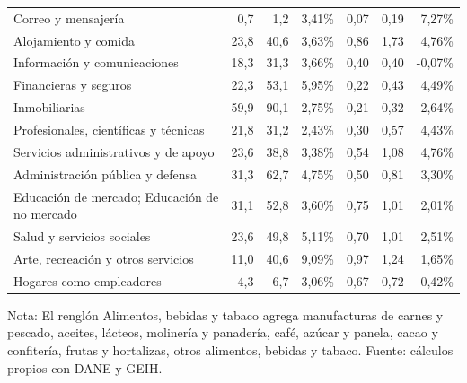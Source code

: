 \begin{longtable}{p{}rrrrrr}
Correo y mensajería & 0,7 & 1,2 & 3,41\% & 0,07 & 0,19 & 7,27\% \\
Alojamiento y comida & 23,8 & 40,6 & 3,63\% & 0,86 & 1,73 & 4,76\% \\
Información y comunicaciones & 18,3 & 31,3 & 3,66\% & 0,40 & 0,40 & -0,07\% \\
Financieras y seguros & 22,3 & 53,1 & 5,95\% & 0,22 & 0,43 & 4,49\% \\
Inmobiliarias & 59,9 & 90,1 & 2,75\% & 0,21 & 0,32 & 2,64\% \\
Profesionales, científicas y técnicas & 21,8 & 31,2 & 2,43\% & 0,30 & 0,57 & 4,43\% \\
Servicios administrativos y de apoyo & 23,6 & 38,8 & 3,38\% & 0,54 & 1,08 & 4,76\% \\
Administración pública y defensa & 31,3 & 62,7 & 4,75\% & 0,50 & 0,81 & 3,30\% \\
Educación de mercado; Educación de no mercado & 31,1 & 52,8 & 3,60\% & 0,75 & 1,01 & 2,01\% \\
Salud y servicios sociales & 23,6 & 49,8 & 5,11\% & 0,70 & 1,01 & 2,51\% \\
Arte, recreación y otros servicios & 11,0 & 40,6 & 9,09\% & 0,97 & 1,24 & 1,65\% \\
Hogares como empleadores & 4,3 & 6,7 & 3,06\% & 0,67 & 0,72 & 0,42\% \\
\bottomrule
\end{longtable}
\endgroup
{\footnotesize Nota: El renglón Alimentos, bebidas y tabaco agrega manufacturas de carnes y pescado, aceites, lácteos, molinería y panadería, café, azúcar y panela, cacao y confitería, frutas y hortalizas, otros alimentos, bebidas y tabaco. Fuente: cálculos propios con DANE y GEIH.}
